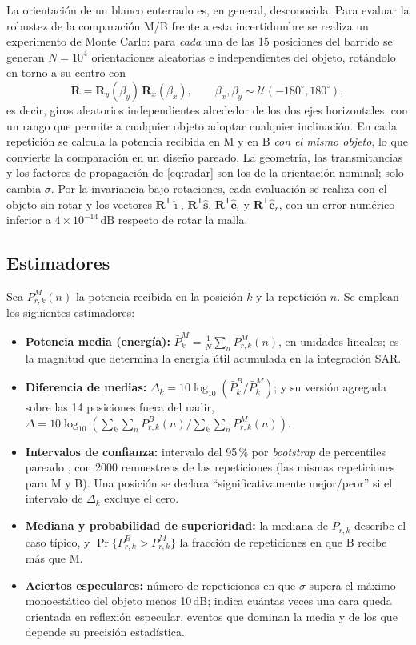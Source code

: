 \documentclass[11pt,a4paper]{report}
\newcommand{\dB}{\,\mathrm{dB}}
\newcommand{\uv}[1]{\hat{\bm{#1}}}
\begin{document}
La orientación de un blanco enterrado es, en general, desconocida. Para
evaluar la robustez de la comparación M/B frente a esta incertidumbre se
realiza un experimento de Monte Carlo: para \emph{cada} una de las 15
posiciones del barrido se generan $N=10^4$ orientaciones aleatorias e
independientes del objeto, rotándolo en torno a su centro con
\begin{equation}
  \mathbf{R} = \mathbf{R}_y(\beta_y)\,\mathbf{R}_x(\beta_x),
  \qquad \beta_x,\beta_y \sim \mathcal{U}(-180^\circ,180^\circ),
\end{equation}
es decir, giros aleatorios independientes alrededor de los dos ejes
horizontales, con un rango que permite a cualquier objeto adoptar cualquier
inclinación. En cada repetición se calcula la potencia recibida en M y en B
\emph{con el mismo objeto}, lo que convierte la comparación en un diseño
pareado. La geometría, las transmitancias y los factores de propagación de
\eqref{eq:radar} son los de la orientación nominal; solo cambia $\sigma$.
Por la invariancia bajo rotaciones, cada evaluación se realiza con el
objeto sin rotar y los vectores
$\mathbf{R}^{\mathsf T}\uv{\imath}$, $\mathbf{R}^{\mathsf T}\uv{s}$,
$\mathbf{R}^{\mathsf T}\uv{e}_i$ y $\mathbf{R}^{\mathsf T}\uv{e}_r$, con un
error numérico inferior a $4\times10^{-14}\dB$ respecto de rotar la malla.

\subsection{Estimadores}

Sea $P_{r,k}^{M}(n)$ la potencia recibida en la posición $k$ y la
repetición $n$. Se emplean los siguientes estimadores:
\begin{itemize}[itemsep=3pt]
  \item \textbf{Potencia media (energía):}
  $\bar P_k^{M}=\frac1N\sum_n P_{r,k}^{M}(n)$, en unidades lineales; es la
  magnitud que determina la energía útil acumulada en la integración SAR.
  \item \textbf{Diferencia de medias:}
  $\Delta_k = 10\log_{10}\left(\bar P_k^{B}/\bar P_k^{M}\right)$; y su
  versión agregada sobre las 14 posiciones fuera del nadir,
  $\Delta = 10\log_{10}\left(\sum_{k}\sum_n P_{r,k}^{B}(n) \big/
  \sum_{k}\sum_n P_{r,k}^{M}(n)\right)$.
  \item \textbf{Intervalos de confianza:} intervalo del 95\,\% por
  \emph{bootstrap} de percentiles pareado \cite{efron1993}, con 2000
  remuestreos de las repeticiones (las mismas repeticiones para M y B).
  Una posición se declara ``significativamente mejor/peor'' si el intervalo
  de $\Delta_k$ excluye el cero.
  \item \textbf{Mediana y probabilidad de superioridad:} la mediana de
  $P_{r,k}$ describe el caso típico, y $\Pr\{P_{r,k}^{B}>P_{r,k}^{M}\}$ la
  fracción de repeticiones en que B recibe más que M.
  \item \textbf{Aciertos especulares:} número de repeticiones en que
  $\sigma$ supera el máximo monoestático del objeto menos 10\,dB; indica
  cuántas veces una cara queda orientada en reflexión especular, eventos
  que dominan la media y de los que depende su precisión estadística.
\end{itemize}
\end{document}
